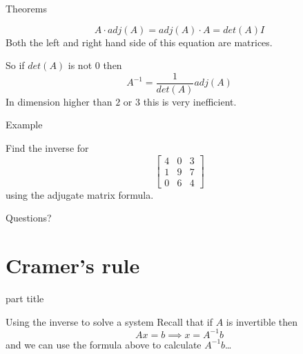 \documentclass{beamer}
\begin{document}
\begin{frame}{Theorems}
  \begin{theorem}
    \begin{equation*}
      A\cdot adj(A) = adj(A)\cdot A = det(A) I
    \end{equation*}
    Both the left and right hand side of this equation are matrices.
  \end{theorem}\vfill
  So if $det(A)$ is not $0$ then
  \begin{equation*}
    A^{-1} = \frac{1}{det(A)}adj(A)
  \end{equation*}
  In dimension higher than $2$ or $3$ this is very inefficient.
\end{frame}

\begin{frame}{Example}
  \begin{example}
    Find the inverse for
    \begin{equation*}
      \left[
	\begin{array}{ccc}
          4&0&3\\
          1&9&7\\
          0&6&4
	\end{array}
      \right]
    \end{equation*}
    using the adjugate matrix formula.
  \end{example}
\end{frame}

\begin{frame}
  Questions?
\end{frame}

\section{Cramer's rule}

\begin{frame}
  \begin{beamercolorbox}[sep=12pt,center]{part title}
    \insertsection\par
  \end{beamercolorbox}
\end{frame}

\begin{frame}{Using the inverse to solve a system}
  Recall that if $A$ is invertible then
  \begin{equation*}
    Ax=b \implies x = A^{-1}b
  \end{equation*}
  and we can use the formula above to calculate $A^{-1}b$\dots
\end{frame}
\end{document}
